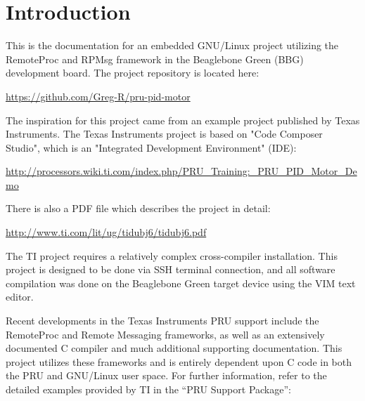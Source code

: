 %
%
%

\chapter{Introduction}

This is the documentation for an embedded GNU/Linux project utilizing the RemoteProc and RPMsg framework in the Beaglebone Green (BBG) development board.  The project repository is located here:

\url{https://github.com/Greg-R/pru-pid-motor}

The inspiration for this project came from an example project published by Texas Instruments.  The Texas Instruments project is based on "Code Composer Studio", which is an "Integrated Development Environment" (IDE):

\url{http://processors.wiki.ti.com/index.php/PRU_Training:_PRU_PID_Motor_Demo}

There is also a PDF file which describes the project in detail:

\url{http://www.ti.com/lit/ug/tidubj6/tidubj6.pdf}

The TI project requires a relatively complex cross-compiler installation.  This project is designed to be done via SSH terminal connection, and all software compilation was done on the Beaglebone Green target device using the VIM text editor.

Recent developments in the Texas Instruments PRU support include the RemoteProc and Remote Messaging frameworks, as well as an extensively documented C compiler and much additional supporting documentation.  This project utilizes these frameworks and is entirely dependent upon C code in both the PRU and GNU/Linux user space.  For further information, refer to the detailed examples provided by TI in the ``PRU Support Package'':

